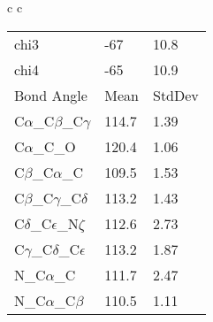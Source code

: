 \begin{longtable}{ c c }
\begin{tabular}{ l l l }
  chi3 & -67 & 10.8 \\ 
  chi4 & -65 & 10.9 \\ \midrule
  Bond Angle   & Mean     & StdDev \\ \midrule
  C$\alpha$\_C$\beta$\_C$\gamma$ & 114.7 & 1.39\\
  C$\alpha$\_C\_O & 120.4 & 1.06\\
  C$\beta$\_C$\alpha$\_C & 109.5 & 1.53\\
  C$\beta$\_C$\gamma$\_C$\delta$ & 113.2 & 1.43\\
  C$\delta$\_C$\epsilon$\_N$\zeta$ & 112.6 & 2.73\\
  C$\gamma$\_C$\delta$\_C$\epsilon$ & 113.2 & 1.87\\
  N\_C$\alpha$\_C & 111.7 & 2.47\\
  N\_C$\alpha$\_C$\beta$ & 110.5 & 1.11\\
  \bottomrule
  \end{tabular}
  \\
  
\end{longtable}
\newpage
